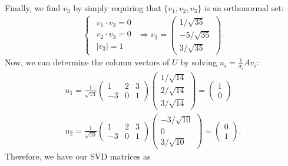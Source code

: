 Finally, we find $v_3$ by simply requiring that $\{ v_1,v_2,v_3 \} $ is an orthonormal set:
\begin{eqnarray}
    \label{eq:v3}
    \begin{cases}
    \begin{aligned}
    v_1 \cdot v_3 = 0 \\
    v_2 \cdot v_3 = 0 \\
    |v_3| = 1
    \end{aligned}
    \end{cases}
    \Rightarrow 
    v_3 =
    \begin{pmatrix}
    1/\sqrt{35} \\ -5/\sqrt{35} \\ 3/\sqrt{35}
    \end{pmatrix}
.\end{eqnarray}
Now, we can determine the column vectors of $U$ by solving $u_i = \frac{1}{\sigma_{i}}Av_{i}$:
\begin{eqnarray}
    \label{eq:u1-u2}
    u_{1} = \frac{1}{\sqrt{14}}
    \begin{pmatrix}
        1 & 2 & 3 \\
        -3 & 0 & 1
    \end{pmatrix}
    \begin{pmatrix}
    1/\sqrt{14} \\ 2/\sqrt{14} \\ 3/\sqrt{14}
    \end{pmatrix}
    =
    \begin{pmatrix}
        1 \\ 0
    \end{pmatrix}
    \\
    u_{2} = \frac{1}{\sqrt{10}}
    \begin{pmatrix}
    1 & 2 & 3 \\
    -3 & 0 & 1
    \end{pmatrix}
    \begin{pmatrix}
       -3/\sqrt{10} \\ 0 \\ 3/\sqrt{10} 
    \end{pmatrix}
    =
    \begin{pmatrix}
    0 \\ 1
    \end{pmatrix}
.\end{eqnarray}
Therefore, we have our SVD matrices as
